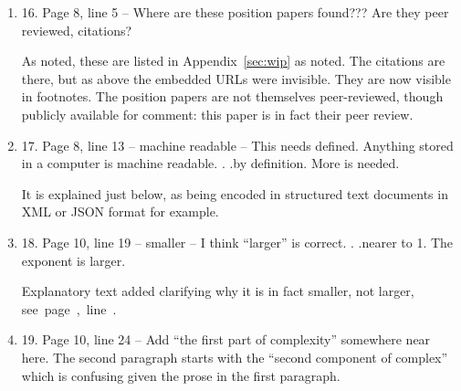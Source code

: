 \documentclass[gmd,manuscript]{copernicus}
\newcommand{\plref}[1]{\mbox{see page \pageref{p-#1}, line
    \lineref{l-#1}.}}
\newenvironment{answer}{\color{blue}}{}
\begin{document}
\begin{enumerate}[label=RC1-\arabic*,leftmargin=*]
  \begin{answer}
    In the first draft we used embedded URLs, which were not visible
    by editorial decision on coloured text. All URLs have now been
    made visible as footnotes, including this one, \plref{RC1-15}
  \end{answer}
\item 16. Page 8, line 5 -- Where are these position papers found???
  Are they peer reviewed, citations?

  \begin{answer}
    As noted, these are listed in Appendix~\ref{sec:wip} as noted. The
    citations are there, but as above the embedded URLs were
    invisible. They are now visible in footnotes. The position papers
    are not themselves peer-reviewed, though publicly available for
    comment: this paper is in fact their peer review.
  \end{answer}
\item 17. Page 8, line 13 -- machine readable -- This needs defined.
  Anything stored in a computer is machine readable. . .by definition.
  More is needed.

  \begin{answer}
    It is explained just below, as being encoded in structured text
    documents in XML or JSON format for example.
  \end{answer}
\item 18. Page 10, line 19 -- smaller -- I think “larger” is correct. .
  .nearer to 1. The exponent is larger.

  \begin{answer}
    Explanatory text added clarifying why it is in fact smaller, not
    larger, \plref{RC1-18}
  \end{answer}
\item 19. Page 10, line 24 -- Add “the first part of complexity”
  somewhere near here. The second paragraph starts with the “second
  component of complex” which is confusing given the prose in the
  first paragraph.


\end{enumerate}
\end{document}
